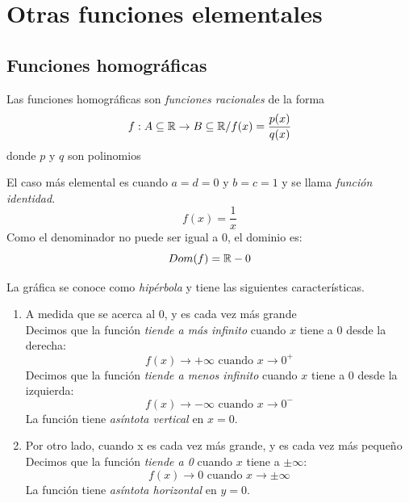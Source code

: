 \chapter*{Otras funciones elementales}
\setcounter{chapter}{1}
\setcounter{section}{0}

\section{Funciones homográficas}
Las funciones homográficas son \emph{funciones racionales} de la forma
$$f : A \subseteq {\mathbb{R}} \rightarrow B \subseteq {\mathbb{R}} / f(x) = \frac{p(x)}{q(x)}$$
donde $p$ y $q$ son polinomios

El caso más elemental es cuando $a = d = 0$ y $b = c = 1$ y se llama \emph{función identidad}.
$$f(x) = \frac{1}{x}$$
Como el denominador no puede ser igual a 0, el dominio es:
$$Dom(f) = {\mathbb{R}} - {0}$$
\begin{center}
\end{center}
La gráfica se conoce como \emph{hipérbola} y tiene las siguientes características.
\begin{enumerate}
    \item {A medida que se acerca al 0, y es cada vez más grande\\
        Decimos que la función \emph{tiende a más infinito} cuando $x$ tiene a 0 desde la derecha:
        $$f(x) \rightarrow +\infty \text{ cuando } x \rightarrow 0^+$$
        Decimos que la función \emph{tiende a menos infinito} cuando $x$ tiene a 0 desde la izquierda:
        $$f(x) \rightarrow -\infty \text{ cuando } x \rightarrow 0^-$$
        La función tiene \emph{asíntota vertical} en $x = 0$.
    }
    \item {Por otro lado, cuando x es cada vez más grande, y es cada vez más pequeño\\
        Decimos que la función \emph{tiende a 0} cuando $x$ tiene a $\pm \infty$:
        $$f(x) \rightarrow 0 \text{ cuando } x \rightarrow \pm \infty$$
        La función tiene \emph{asíntota horizontal} en $y = 0$.

    }
\end{enumerate}
